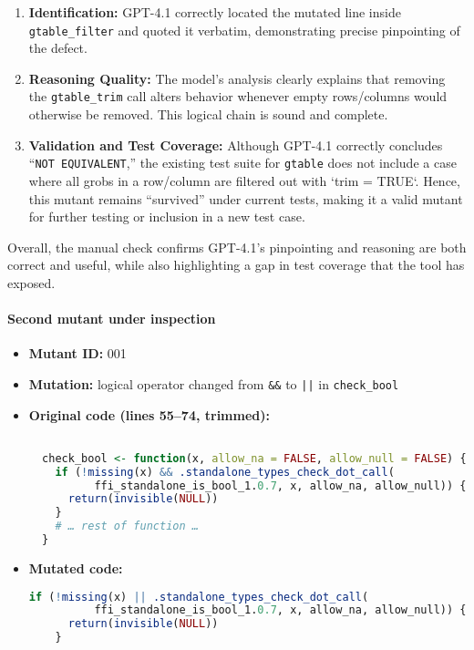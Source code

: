 \begin{enumerate}
  \item \textbf{Identification:}  
    GPT-4.1 correctly located the mutated line inside \texttt{gtable\_filter} and quoted it verbatim, demonstrating precise pinpointing of the defect.
  
     \item \textbf{Reasoning Quality:}  
    The model’s analysis clearly explains that removing the \texttt{gtable\_trim} call alters behavior whenever empty rows/columns would otherwise be removed. This logical chain is sound and complete.


  \item \textbf{Validation and Test Coverage:}  
    Although GPT-4.1 correctly concludes “\texttt{NOT EQUIVALENT},” the existing test suite for \texttt{gtable} does not include a case where all grobs in a row/column are filtered out with `trim = TRUE`.  Hence, this mutant remains “survived” under current tests, making it a valid mutant for further testing or inclusion in a new test case.
\end{enumerate}

Overall, the manual check confirms GPT-4.1’s pinpointing and reasoning are both correct and useful, while also highlighting a gap in test coverage that the tool has exposed.

\paragraph{Second mutant under inspection}
\begin{itemize}
    \item \textbf{Mutant ID:} 001       
    \item \textbf{Mutation:} logical operator changed from \texttt{\&\&} to \texttt{||} in \texttt{check\_bool}
    \item \textbf{Original code (lines 55–74, trimmed):}
\begin{lstlisting}[language=R]

  check_bool <- function(x, allow_na = FALSE, allow_null = FALSE) {
    if (!missing(x) && .standalone_types_check_dot_call(
          ffi_standalone_is_bool_1.0.7, x, allow_na, allow_null)) {
      return(invisible(NULL))
    }
    # … rest of function …
  }
  \end{lstlisting}
  \item \textbf{Mutated code:}
  \begin{lstlisting}[language=R]
    if (!missing(x) || .standalone_types_check_dot_call(
          ffi_standalone_is_bool_1.0.7, x, allow_na, allow_null)) {
      return(invisible(NULL))
    }
  \end{lstlisting}
\end{itemize}

